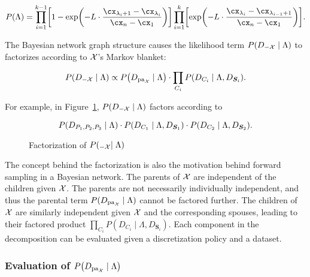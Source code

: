 \begin{small}
\begin{equation}
  \label{eq:p_M}
  P(\Lambda) = \prod_{i=1}^{k-1}
    \brock{
      1 - \exp\paren{
        - L \cdot \frac{
                         \cx_{\lambda_i +1} - \cx_{\lambda_i}
                       }{
                         \cx_n - \cx_1
                        }
      }
    }
    \prod_{i=1}^{k}
	\brock{
    \exp\paren{
      -L \cdot \frac{\cx_{\lambda_{i}} - \cx_{\lambda_{i-1} + 1}}{\cx_n - \cx_1}}
    }\text{.}
\end{equation}
\end{small}

The Bayesian network graph structure causes the likelihood term $P(D_{-\mathcal{X}} \mid \Lambda)$ to factorizes according to $\mathcal{X}$'s Markov blanket:

\begin{equation}
  \label{eq:p_D_given_M}
  P\paren{D_{-\cX} \mid \Lambda} \propto P\paren{D_{\Pa_\cX} \mid \Lambda} \cdot \prod_{C_i} P\paren{D_{C_i} \mid \Lambda, D_{\bm{S}_i}}\text{.}
\end{equation}

For example, in Figure~\ref{fig:example_factorization}, $P(D_{-\mathcal{X}} \mid \Lambda)$ factors according to

\begin{equation}
  P\paren{D_{P_1,P_2,P_3} \mid \Lambda} \cdot P\paren{ D_{ C_1 } \mid \Lambda, D_{\bm{S}_1} } \cdot P\paren{D_{C_2} \mid \Lambda, D_{\bm{S}_2}}\text{.}
\end{equation}

\begin{figure}[ht]
  \centering
  
  \caption{Factorization of $P(_{-\mathcal{X}} \mid \Lambda)$}
  \label{fig:example_factorization}
\end{figure}

The concept behind the factorization is also the motivation behind forward sampling in a Bayesian network.
The parents of $\mathcal{X}$ are independent of the children given $\mathcal{X}$.
The parents are not necessarily individually independent, and thus the parental term $P(D_{\operatorname{pa}_{\mathcal{X}}} \mid \Lambda)$ cannot be factored further.
The children of $\mathcal{X}$ are similarly independent given $\mathcal{X}$ and the corresponding spouses, leading to their factored product $\prod_{C_i} P(D_{C_i} \mid \Lambda, D_{\bm{S}_i})$.
Each component in the decomposition can be evaluated given a discretization policy and a dataset.

\subsubsection{Evaluation of $P\paren{D_{\Pa_{\cX}} \mid \Lambda}$}

